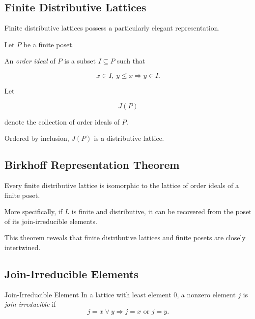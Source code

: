 \subsection{Finite Distributive Lattices}
\label{subsec:finite-distributive-lattices}

Finite distributive lattices possess a particularly elegant representation.

Let \(P\) be a finite poset.

An \emph{order ideal} of \(P\) is a subset \(I\subseteq P\) such that

\[ x\in I,\ y\leq x\Longrightarrow y\in I. \]

Let

\[ J(P) \]

denote the collection of order ideals of \(P\).

Ordered by inclusion, \(J(P)\) is a distributive lattice.

\subsection{Birkhoff Representation Theorem}
\label{subsec:birkhoff-representation-lattices}

\begin{theorem}
Every finite distributive lattice is isomorphic to the lattice of order
ideals of a finite poset.
\end{theorem}

More specifically, if \(L\) is finite and distributive, it can be recovered
from the poset of its join-irreducible elements.

This theorem reveals that finite distributive lattices and finite posets are
closely intertwined.

\subsection{Join-Irreducible Elements}
\label{subsec:join-irreducible}

\begin{definitionbox}{Join-Irreducible Element}
In a lattice with least element \(0\), a nonzero element \(j\) is
\emph{join-irreducible} if
\[ j=x\vee y\Longrightarrow j=x\text{ or }j=y. \]
\end{definitionbox}

